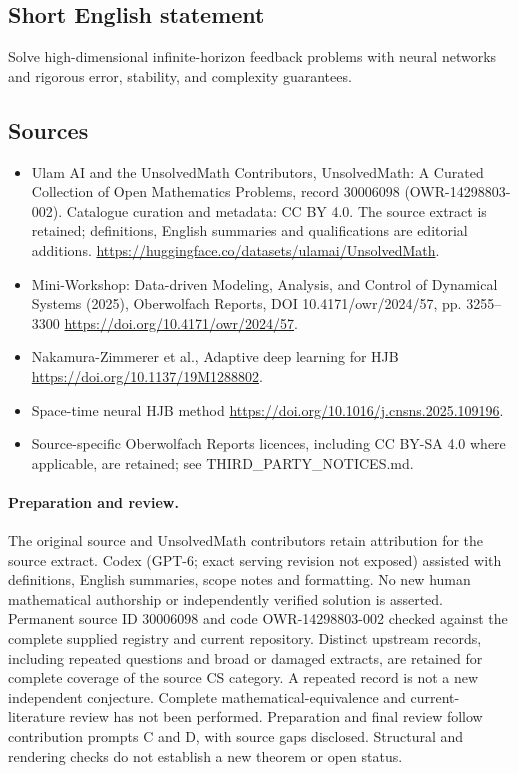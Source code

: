 \documentclass[11pt]{article}
\begin{document}
\subsection{Short English statement}
Solve high-dimensional infinite-horizon feedback problems with neural networks and rigorous error, stability, and complexity guarantees.
\subsection{Sources}
\begin{itemize}
\item[\hypertarget{source:30006098:1}{S1}] Ulam AI and the UnsolvedMath Contributors, UnsolvedMath: A Curated Collection of Open Mathematics Problems, record 30006098 (OWR-14298803-002). Catalogue curation and metadata: CC BY 4.0. The source extract is retained; definitions, English summaries and qualifications are editorial additions.
\url{https://huggingface.co/datasets/ulamai/UnsolvedMath}.
\item[\hypertarget{source:30006098:2}{S2}] Mini-Workshop: Data-driven Modeling, Analysis, and Control of Dynamical Systems (2025), Oberwolfach Reports, DOI 10.4171/owr/2024/57, pp. 3255--3300
\url{https://doi.org/10.4171/owr/2024/57}.
\item[\hypertarget{source:30006098:3}{S3}] Nakamura-Zimmerer et al., Adaptive deep learning for HJB
\url{https://doi.org/10.1137/19M1288802}.
\item[\hypertarget{source:30006098:4}{S4}] Space-time neural HJB method
\url{https://doi.org/10.1016/j.cnsns.2025.109196}.
\item Source-specific Oberwolfach Reports licences, including CC BY-SA 4.0 where applicable, are retained; see THIRD\_PARTY\_NOTICES.md.
\end{itemize}
\paragraph{Preparation and review.}
The original source and UnsolvedMath contributors retain attribution for the source extract. Codex (GPT-6; exact serving revision not exposed) assisted with definitions, English summaries, scope notes and formatting. No new human mathematical authorship or independently verified solution is asserted. Permanent source ID 30006098 and code OWR-14298803-002 checked against the complete supplied registry and current repository. Distinct upstream records, including repeated questions and broad or damaged extracts, are retained for complete coverage of the source CS category. A repeated record is not a new independent conjecture. Complete mathematical-equivalence and current-literature review has not been performed. Preparation and final review follow contribution prompts C and D, with source gaps disclosed. Structural and rendering checks do not establish a new theorem or open status.
\label{end:30006098}
\end{document}

